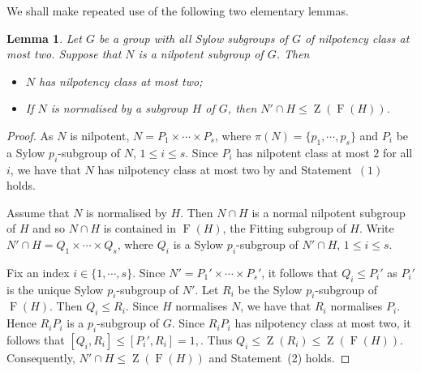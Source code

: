 \documentclass[12pt,a4paper]{article}
\DeclareMathOperator{\Z}{Z}
\DeclareMathOperator{\Fit}{F}
\newtheorem{lemma}[theorem]{Lemma}
\theoremstyle{definition}
\begin{document}


We shall make repeated use of the following two elementary lemmas.


\begin{lemma}\label{lem-class-two-property}
Let $G$ be a group with all Sylow subgroups of $G$ of nilpotency class at most two. Suppose that $N$ is a nilpotent subgroup of $G$. Then
\begin{itemize}
\item[\emph{(1)}] $N$ has nilpotency class at most two;
\item[\emph{(2)}] If $N$ is normalised by a subgroup $H$ of $G$, then $N' \cap H \leq\Z(\Fit(H))$.
\end{itemize}
\end{lemma}
\begin{proof}
As $N$ is nilpotent, $N=P_1 \times \cdots \times P_s$, where  $\pi(N)=\{p_1,\cdots,p_s\}$ and $P_i$ be a Sylow $p_i$-subgroup of $N$, $1 \leq i \leq s$. Since $P_i$ has nilpotent class at most $2$ for all $i$, we have that $N$ has nilpotency class at most two by \cite[Theorem~A.8.2]{DoerkHawkes1992} and Statement~$(1)$ holds.


Assume that $N$ is normalised by $H$. Then $N \cap H$ is a normal nilpotent subgroup of $H$ and so $N \cap H$ is contained in $\Fit(H)$, the Fitting subgroup of $H$. Write $N' \cap H=Q_1 \times \cdots \times Q_s$, where $Q_i$ is a Sylow $p_i$-subgroup of $N' \cap H$, $1 \leq i \leq s$.

Fix an index $i \in \{1, \cdots, s\}$. Since $N'=P_1' \times \cdots \times P_s'$, it follows that $Q_i \leq P_i'$ as $P_i'$ is the unique Sylow $p_i$-subgroup of $N'$.  Let $R_i$ be the Sylow $p_i$-subgroup of $\Fit(H)$. Then $Q_i \leq R_i$. Since $H$ normalises $N$, we have that $R_i$ normalises $P_i$. Hence $R_iP_i$ is a $p_i$-subgroup of $G$. Since $R_iP_i$ has nilpotency class at most two, it follows that $[Q_i,R_i]\leq [P_i', R_i]=1,$. Thus $Q_i \leq \Z(R_i) \leq \Z(\Fit(H))$. Consequently, $N' \cap H\leq \Z(\Fit(H))$ and Statement~(2) holds.
\end{proof}
\end{document}
